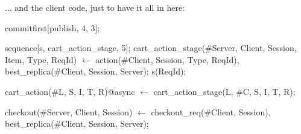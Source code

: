 ... and the client code, just to have it all in here:

\begin{Dedalus}
commitfirst[publish, 4, 3];

sequence[s, cart_action_stage, 5];
cart_action_stage(#Server, Client, Session, Item, Type, ReqId) \(\leftarrow\)
    action(#Client, Session, Type, ReqId),
    best_replica(#Client, Session, Server);
    s(ReqId);

cart_action(#L, S, I, T, R)@async \(\leftarrow\) 
    cart_action_stage(L, #C, S, I, T, R);

checkout(#Server, Client, Session) \(\leftarrow\)
    checkout_req(#Client, Session),
    best_replica(#Client, Session, Server);
\end{Dedalus}
